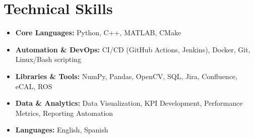 \section{Technical Skills}
    \begin{itemize}[leftmargin=0.15in, label={}, itemsep=2pt]
        \item \textbf{Core Languages:} Python, C++, MATLAB, CMake
        \item \textbf{Automation \& DevOps:} CI/CD (GitHub Actions, Jenkins), Docker, Git, Linux/Bash scripting
        \item \textbf{Libraries \& Tools:} NumPy, Pandas, OpenCV, SQL, Jira, Confluence, eCAL, ROS
        \item \textbf{Data \& Analytics:} Data Visualization, KPI Development, Performance Metrics, Reporting Automation
        \item \textbf{Languages:} English, Spanish
    \end{itemize}
